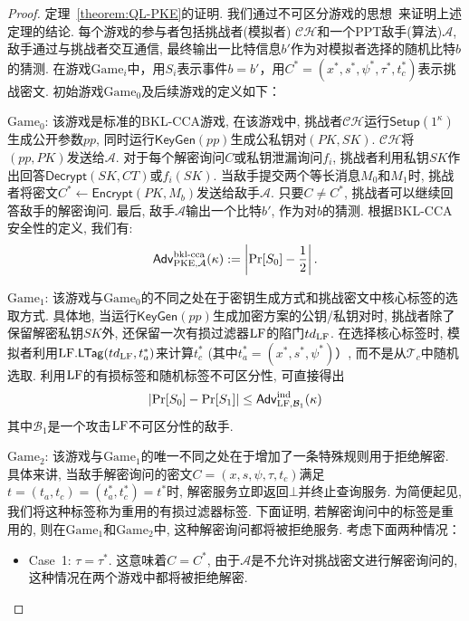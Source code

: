 \begin{proof}{定理~\ref{theorem:QL-PKE}的证明.}
我们通过不可区分游戏的思想~\cite{Shoup-ePrint-2004}来证明上述定理的结论. 每个游戏的参与者包括挑战者(模拟者) $\mathcal{CH}$和一个PPT敌手(算法)$\mathcal{A}$, 敌手通过与挑战者交互通信, 最终输出一比特信息$b'$作为对模拟者选择的随机比特$b$的猜测. 在游戏$\text{Game}_i$中，用$S_i$表示事件$b=b'$，用$C^*=(x^*, s^*,\psi^*,\tau^*,t_c^*)$表示挑战密文. 初始游戏$\text{Game}_0$及后续游戏的定义如下：
\begin{trivlist}
\item $\text{Game}_0$: 该游戏是标准的BKL-CCA游戏, 在该游戏中, 挑战者$\mathcal{CH}$运行$\mathsf{Setup}(1^\kappa)$生成公开参数$pp$, 同时运行$\mathsf{KeyGen}(pp)$生成公私钥对$(PK, SK)$. $\mathcal{CH}$将$(pp, PK)$发送给$\mathcal{A}$. 对于每个解密询问$C$或私钥泄漏询问$f_i$, 挑战者利用私钥$SK$作出回答$\mathsf{Decrypt}(SK, CT)$或$f_i(SK)$. 当敌手提交两个等长消息$M_0$和$M_1$时, 挑战者将密文$C^* \leftarrow \mathsf{Encrypt}(PK, M_b)$发送给敌手$\mathcal{A}$. 只要$C \neq C^*$, 挑战者可以继续回答敌手的解密询问. 最后, 敌手$\mathcal{A}$输出一个比特$b'$, 作为对$b$的猜测. 根据BKL-CCA安全性的定义, 我们有: 
\begin{equation*}
	\mathsf{Adv}_{\text{PKE},\mathcal{A}}^{\textup{bkl-cca}}(\kappa):=\left|\textup{Pr}[S_0]-\frac{1}{2}\right|.
\end{equation*}

\item $\text{Game}_1$: 该游戏与$\text{Game}_0$的不同之处在于密钥生成方式和挑战密文中核心标签的选取方式. 具体地, 当运行$\mathsf{KeyGen}(pp)$生成加密方案的公钥/私钥对时, 挑战者除了保留解密私钥$SK$外, 还保留一次有损过滤器$\text{LF}$的陷门$td_{\text{LF}}$. 在选择核心标签时, 模拟者利用$\text{LF}.\mathsf{LTag}(td_{\text{LF}},t_a^*)$来计算$t_c^*$ (其中$t_a^*=(x^*, s^*, \psi^*)$）, 而不是从$\mathcal{T}_c$中随机选取. 利用$\text{LF}$的有损标签和随机标签不可区分性, 可直接得出
\[
|\textup{Pr}[S_0]-\textup{Pr}[S_1]|\leq \mathsf{Adv}_{\text{LF},\mathcal{B}_1}^{\textup{ind}}(\kappa)
\]
其中$\mathcal{B}_1$是一个攻击$\text{LF}$不可区分性的敌手.

\item $\text{Game}_2$: 该游戏与$\text{Game}_1$的唯一不同之处在于增加了一条特殊规则用于拒绝解密. 具体来讲, 当敌手解密询问的密文$C=(x,s,\psi,\tau,t_c)$满足$t=(t_a, t_c)=(t_a^*,t_c^*)=t^*$时, 解密服务立即返回$\bot$并终止查询服务. 为简便起见, 我们将这种标签称为重用的有损过滤器标签. 下面证明, 若解密询问中的标签是重用的, 则在$\text{Game}_1$和$\text{Game}_2$中, 这种解密询问都将被拒绝服务. 考虑下面两种情况：
\begin{itemize}
\item Case~1: $\tau = \tau^*$. 这意味着$C=C^*$, 由于$\mathcal{A}$是不允许对挑战密文进行解密询问的, 这种情况在两个游戏中都将被拒绝解密.


\end{itemize}
\end{trivlist}
\end{proof}
